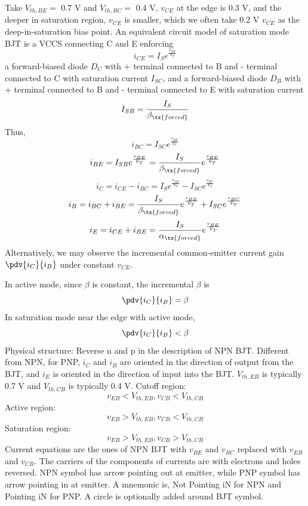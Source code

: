 \documentclass[a4paper,12pt]{report}
\begin{document}
Take $V_{th,BE}=$ 0.7 V and $V_{th,BC}=$ 0.4 V, $v_{CE}$ at the edge is 0.3 V, and the deeper in saturation region, $v_{CE}$ is smaller, which we often take 0.2 V $v_{CE}$ as the deep-in-saturation bias point.
An equivalent circuit model of saturation mode BJT is a VCCS connecting C and E enforcing
\[i_{CE}=I_Se^{\frac{v_{BE}}{V_T}}\]
a forward-biased diode $D_C$ with + terminal connected to B and - terminal connected to C with saturation current $I_{SC}$, and a forward-biased diode $D_B$ with + terminal connected to B and - terminal connected to E with saturation current
\[I_{SB}=\frac{I_S}{\beta_{\tx{forced}}}\]
Thus,
\[i_{BC}=I_{SC}e^{\frac{v_{BE}}{V_T}}\]
\[i_{BE}=I_{SB}e^{\frac{v_{BE}}{V_T}}=\frac{I_S}{\beta_{\tx{forced}}}e^{\frac{v_{BE}}{V_T}}\]
\[i_C=i_{CE}-i_{BC}=I_Se^{\frac{v_{BE}}{V_T}}-I_{SC}e^{\frac{v_{BC}}{V_T}}\]
\[i_B=i_{BC}+i_{BE}=\frac{I_S}{\beta_{\tx{forced}}}e^{\frac{v_{BE}}{V_T}}+I_{SC}e^{\frac{v_{BC}}{V_T}}\]
\[i_E=i_{CE}+i_{BE}=\frac{I_S}{\alpha_{\tx{forced}}}e^{\frac{v_{BE}}{V_T}}\]
Alternatively, we may observe the incremental common-emitter current gain $\pdv{i_C}{i_B}$ under constant $v_{CE}$.

In active mode, since $\beta$ is constant, the incremental $\beta$ is
\[\pdv{i_C}{i_B}=\beta\]
In saturation mode near the edge with active mode,
\[\pdv{i_C}{i_B}<\beta\]
\bit
\itm Physical structure: Reverse n and p in the description of NPN BJT. Different from NPN, for PNP, $i_C$ and $i_B$ are oriented in the direction of output from the BJT, and $i_E$ is oriented in the direction of input into the BJT. $V_{th,EB}$ is typically 0.7 V and $V_{th,CB}$ is typically 0.4 V.
\itm Cutoff region:
\[v_{EB}<V_{th,EB},v_{CB}<V_{th,CB}\]
\itm Active region:
\[v_{EB}>V_{th,EB},v_{CB}<V_{th,CB}\]
\itm Saturation region:
\[v_{EB}>V_{th,EB},v_{CB}>V_{th,CB}\]
\itm Current equations are the ones of NPN BJT with $v_{BE}$ and $v_{BC}$ replaced with $v_{EB}$ and $v_{CB}$. The carriers of the components of currents are with electrons and holes reversed.
\eit
{}
NPN symbol has arrow pointing out at emitter, while PNP symbol has arrow pointing in at emitter. A mnemonic is, Not Pointing iN for NPN and Pointing iN for PNP. A circle is optionally added around BJT symbol.
\begin{center}
\end{center}
\end{document}
